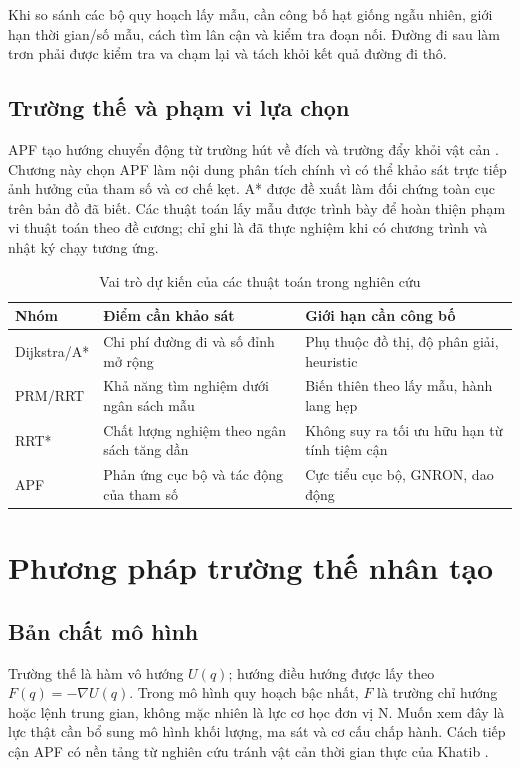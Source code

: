 \documentclass[12pt,a4paper,oneside]{report}
\numberwithin{equation}{chapter}
\begin{document}
Khi so sánh các bộ quy hoạch lấy mẫu, cần công bố hạt giống ngẫu nhiên, giới hạn thời gian/số mẫu, cách tìm lân cận và kiểm tra đoạn nối. Đường đi sau làm trơn phải được kiểm tra va chạm lại và tách khỏi kết quả đường đi thô.

\subsection{Trường thế và phạm vi lựa chọn}

APF tạo hướng chuyển động từ trường hút về đích và trường đẩy khỏi vật cản \cite{khatib}. Chương này chọn APF làm nội dung phân tích chính vì có thể khảo sát trực tiếp ảnh hưởng của tham số và cơ chế kẹt. A* được đề xuất làm đối chứng toàn cục trên bản đồ đã biết. Các thuật toán lấy mẫu được trình bày để hoàn thiện phạm vi thuật toán theo đề cương; chỉ ghi là đã thực nghiệm khi có chương trình và nhật ký chạy tương ứng.

\begin{table}[htbp]
\centering\small
\caption{Vai trò dự kiến của các thuật toán trong nghiên cứu}
\begin{tabular}{|>{\raggedright\arraybackslash}p{2.2cm}|>{\raggedright\arraybackslash}p{5.3cm}|>{\raggedright\arraybackslash}p{6.2cm}|}\hline
Nhóm & Điểm cần khảo sát & Giới hạn cần công bố\\\hline
Dijkstra/A* & Chi phí đường đi và số đỉnh mở rộng & Phụ thuộc đồ thị, độ phân giải, heuristic\\\hline
PRM/RRT & Khả năng tìm nghiệm dưới ngân sách mẫu & Biến thiên theo lấy mẫu, hành lang hẹp\\\hline
RRT* & Chất lượng nghiệm theo ngân sách tăng dần & Không suy ra tối ưu hữu hạn từ tính tiệm cận\\\hline
APF & Phản ứng cục bộ và tác động của tham số & Cực tiểu cục bộ, GNRON, dao động\\\hline
\end{tabular}
\end{table}

\section{Phương pháp trường thế nhân tạo}

\subsection{Bản chất mô hình}

Trường thế là hàm vô hướng $U(q)$; hướng điều hướng được lấy theo $F(q)=-\nabla U(q)$. Trong mô hình quy hoạch bậc nhất, $F$ là trường chỉ hướng hoặc lệnh trung gian, không mặc nhiên là lực cơ học đơn vị N. Muốn xem đây là lực thật cần bổ sung mô hình khối lượng, ma sát và cơ cấu chấp hành. Cách tiếp cận APF có nền tảng từ nghiên cứu tránh vật cản thời gian thực của Khatib \cite{khatib}.
\end{document}
